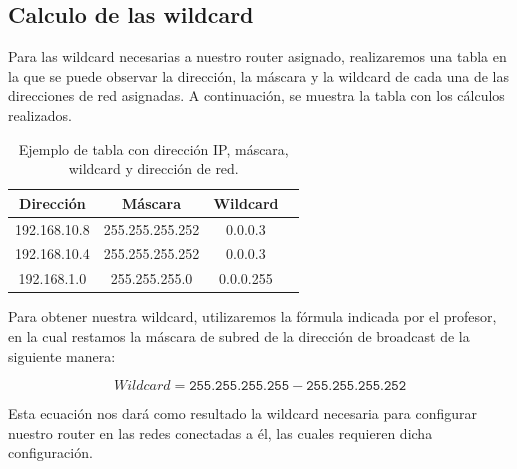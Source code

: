     \subsection{Calculo de las wildcard}
    Para las wildcard necesarias a nuestro router asignado, realizaremos una tabla en la que se puede observar la dirección, la máscara y la wildcard de cada una de las direcciones de red asignadas. A continuación, se muestra la tabla con los cálculos realizados.
        \begin{table}[H]
            \centering
            \begin{tabular}{|c|c|c|c|}
                \hline
                \textbf{Dirección} & \textbf{Máscara} & \textbf{Wildcard} \\
                \hline
                192.168.10.8 & 255.255.255.252 & 0.0.0.3 \\
                \hline
                \hline
                192.168.10.4 & 255.255.255.252 & 0.0.0.3  \\
                \hline
                \hline
                192.168.1.0 & 255.255.255.0 & 0.0.0.255 \\
                \hline
            \end{tabular}
            \caption{Ejemplo de tabla con dirección IP, máscara, wildcard y dirección de red.}
        \end{table}
        Para obtener nuestra wildcard, utilizaremos la fórmula indicada por el profesor, en la cual restamos la máscara de subred de la dirección de broadcast de la siguiente manera:

        \begin{equation}
            Wildcard = \texttt{255.255.255.255} - \texttt{255.255.255.252}
           \end{equation}
        
        Esta ecuación nos dará como resultado la wildcard necesaria para configurar nuestro router en las redes conectadas a él, las cuales requieren dicha configuración.
